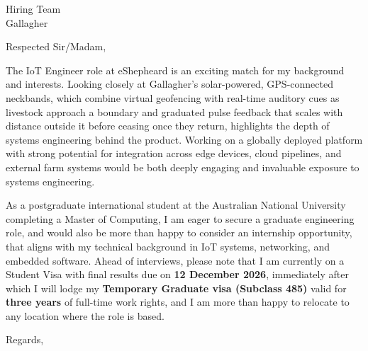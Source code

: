 \documentclass{letter}
\makeatletter
\renewcommand{\closing}[1]{\par\nobreak\vspace{\parskip}%
  \stopbreaks
  \noindent
  \ifx\@empty\fromaddress\else
  \hspace*{\longindentation}\fi
  \parbox{\indentedwidth}{\raggedright
       \ignorespaces #1\\[2\medskipamount]%
       \ifx\@empty\fromsig
           \fromname
       \else \fromsig \fi\strut}%
   \par}
\makeatother
\begin{document}
\begin{letter}{Hiring Team\\Gallagher}
\opening{Respected Sir/Madam,}

The IoT Engineer role at eShepheard is an exciting match for my background and interests. Looking closely at Gallagher's solar-powered, GPS-connected neckbands, which combine virtual geofencing with real-time auditory cues as livestock approach a boundary and graduated pulse feedback that scales with distance outside it before ceasing once they return, highlights the depth of systems engineering behind the product. Working on a globally deployed platform with strong potential for integration across edge devices, cloud pipelines, and external farm systems would be both deeply engaging and invaluable exposure to systems engineering.

As a postgraduate international student at the Australian National University completing a Master of Computing, I am eager to secure a graduate engineering role, and would also be more than happy to consider an internship opportunity, that aligns with my technical background in IoT systems, networking, and embedded software. Ahead of interviews, please note that I am currently on a Student Visa with final results due on \textbf{12 December 2026}, immediately after which I will lodge my \textbf{Temporary Graduate visa (Subclass 485)} valid for \textbf{three years} of full-time work rights, and I am more than happy to relocate to any location where the role is based.

\closing{Regards,}
\end{letter}
\end{document}
